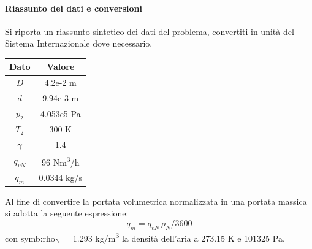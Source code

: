 \paragraph{Riassunto dei dati e conversioni}
Si riporta un riassunto sintetico dei dati del problema, convertiti in unità del Sistema Internazionale dove necessario.
\begin{table}[H]
	\centering
	\begin{tabular}{c|c}
			\toprule
			\toprule
			\textbf{Dato} & \textbf{Valore} \\
			\midrule
			\midrule
			$D$ & 4.2e-2 m \\
			\midrule
			$d$ & 9.94e-3 m \\
			\midrule
			$p_2$ & 4.053e5 Pa\\
			\midrule
			$T_2$ & 300 K\\
			\midrule
			$\gamma $ & 1.4 \\
			\midrule
			$q_{\textit{vN}}$ & 96 Nm\textsuperscript{3}/h	\\
			\midrule
			$q_m$ & 0.0344 kg/s\\
			\bottomrule
			\bottomrule
	\end{tabular}
\end{table}
Al fine di convertire la portata volumetrica normalizzata in una portata massica si adotta la seguente espressione: 
\begin{equation}
	q_m = q_{\textit{vN}}\, \rho_N / 3600 
\end{equation}
con \gls{symb:rho}\textsubscript{N} = 1.293 kg/m\textsuperscript{3} la densità dell'aria a 273.15 K e 101325 Pa.

